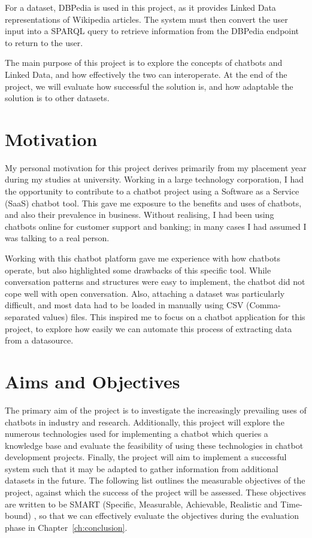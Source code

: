 For a dataset, DBPedia \cite{dbpedia2019about} is used in this project, as it provides Linked Data representations of Wikipedia articles. The system must then convert the user input into a SPARQL query to retrieve information from the DBPedia endpoint to return to the user.

The main purpose of this project is to explore the concepts of chatbots and Linked Data, and how effectively the two can interoperate. At the end of the project, we will evaluate how successful the solution is, and how adaptable the solution is to other datasets.

\section{Motivation}
My personal motivation for this project derives primarily from my placement year during my studies at university. Working in a large technology corporation, I had the opportunity to contribute to a chatbot project using a Software as a Service (SaaS) chatbot tool. This gave me exposure to the benefits and uses of chatbots, and also their prevalence in business. Without realising, I had been using chatbots online for customer support and banking; in many cases I had assumed I was talking to a real person.

Working with this chatbot platform gave me experience with how chatbots operate, but also highlighted some drawbacks of this specific tool. While conversation patterns and structures were easy to implement, the chatbot did not cope well with open conversation. Also, attaching a dataset was particularly difficult, and most data had to be loaded in manually using CSV (Comma-separated values) files. This inspired me to focus on a chatbot application for this project, to explore how easily we can automate this process of extracting data from a datasource.

\newpage
\section{Aims and Objectives}
\label{sec:aims}
The primary aim of the project is to investigate the increasingly prevailing uses of chatbots in industry and research. Additionally, this project will explore the numerous technologies used for implementing a chatbot which queries a knowledge base and evaluate the feasibility of using these technologies in chatbot development projects. Finally, the project will aim to implement a successful system such that it may be adapted to gather information from additional datasets in the future. The following list outlines the measurable objectives of the project, against which the success of the project will be assessed. These objectives are written to be SMART (Specific, Measurable, Achievable, Realistic and Time-bound) \cite{smart}, so that we can effectively evaluate the objectives during the evaluation phase in Chapter~\ref{ch:conclusion}.

